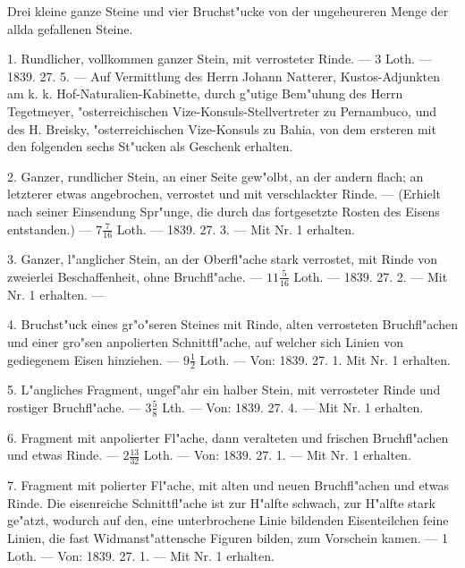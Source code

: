 \documentclass[a4paper, 11pt, oneside, polutonikogreek, german]{article}
\begin{document}
Drei kleine ganze Steine und vier Bruchst"ucke von der ungeheureren Menge der allda gefallenen Steine.

1. Rundlicher, vollkommen ganzer Stein, mit verrosteter Rinde. --- 3 Loth. --- 1839. 27. 5. --- Auf Vermittlung des Herrn Johann Natterer, Kustos-Adjunkten am k. k. Hof-Naturalien-Kabinette, durch g"utige Bem"uhung des Herrn Tegetmeyer, "osterreichischen Vize-Konsuls-Stellvertreter zu Pernambuco, und des H. Breisky, "osterreichischen Vize-Konsuls zu Bahia, von dem ersteren mit den folgenden sechs St"ucken als Geschenk erhalten.

2. Ganzer, rundlicher Stein, an einer Seite gew"olbt, an der andern flach; an letzterer etwas angebrochen, verrostet und mit verschlackter Rinde. --- (Erhielt nach seiner Einsendung Spr"unge, die durch das fortgesetzte Rosten des Eisens entstanden.) --- $\mathfrak{7\frac{7}{16}}$ Loth. --- 1839. 27. 3. --- Mit Nr. 1 erhalten.

3. Ganzer, l"anglicher Stein, an der Oberfl"ache stark verrostet, mit Rinde von zweierlei Beschaffenheit, ohne Bruchfl"ache. --- $\mathfrak{11\frac{5}{16}}$ Loth. --- 1839. 27. 2. --- Mit Nr. 1 erhalten. ---

4. Bruchst"uck eines gr"o"seren Steines mit Rinde, alten verrosteten Bruchfl"achen und einer gro"sen anpolierten Schnittfl"ache, auf welcher sich Linien von gediegenem Eisen hinziehen. --- $\mathfrak{9\frac{1}{2}}$ Loth. --- Von: 1839. 27. 1. Mit Nr. 1 erhalten.

5. L"angliches Fragment, ungef"ahr ein halber Stein, mit verrosteter Rinde und rostiger Bruchfl"ache. --- $\mathfrak{3\frac{5}{8}}$ Lth. --- Von: 1839. 27. 4. --- Mit Nr. 1 erhalten.

6. Fragment mit anpolierter Fl"ache, dann veralteten und frischen Bruchfl"achen und etwas Rinde. --- $\mathfrak{2\frac{13}{32}}$ Loth. --- Von: 1839. 27. 1. --- Mit Nr. 1 erhalten.

7. Fragment mit polierter Fl"ache, mit alten und neuen Bruchfl"achen und etwas Rinde. Die eisenreiche Schnittfl"ache ist zur H"alfte schwach, zur H"alfte stark ge"atzt, wodurch auf den, eine unterbrochene Linie bildenden Eisenteilchen feine Linien, die fast Widmanst"attensche Figuren bilden, zum Vorschein kamen. --- 1 Loth. --- Von: 1839. 27. 1. --- Mit Nr. 1 erhalten.

\setlength{\leftskip}{10mm}
\setlength{\parindent}{0pt}
\end{document}
